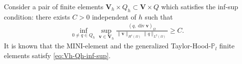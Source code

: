 \documentclass{amsart}
\newcommand{\red}[1]{\textcolor{red}{#1}}
\newtheorem{definition}{Definition}[section]
\newcommand{\algn}[1]{\begin{align} #1 \end{align}}
\newcommand{\dive}{\operatorname{div}}
\begin{document}
Consider a pair of finite elements $\boldsymbol{V}_h \times Q_h \subset \boldsymbol{V}\times Q$ which satisfies the inf-sup condition: there exists $C>0$ independent of $h$ such that 
%
\algn{
	\label{eq:Vh-Qh-inf-sup}
	\inf_{0\not = q \in Q_h} \sup_{\boldsymbol{v}\in \boldsymbol{V}_h} \frac{( q,  \dive \boldsymbol{v})_{\Omega}}{\|\boldsymbol{v}\|_{H^1(\Omega)} \|q\|_{L^2(\Omega)}} \ge C .
}
%
It is known that the MINI-element \cite[Sections 8.6 and 8.7]{BMO} and 
%
the generalized Taylor-Hood-$\mathbb{P}_l$ finite elements satisfy \eqref{eq:Vh-Qh-inf-sup}. 
%
\end{document}
